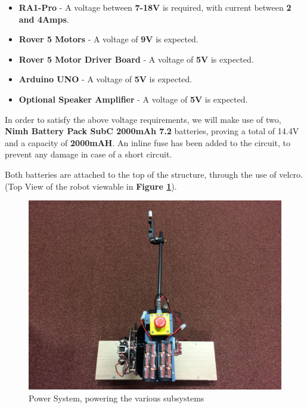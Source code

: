 \documentclass[12p,a4paper]{report}
\begin{document}
\begin{itemize}
\item \textbf{RA1-Pro} - A voltage between \textbf{7-18V} is required, with current between \textbf{2 and 4Amps}.

\item \textbf{Rover 5 Motors} - A voltage of \textbf{9V} is expected.

\item \textbf{Rover 5 Motor Driver Board} - A voltage of \textbf{5V} is expected.

\item \textbf{Arduino UNO} - A voltage of \textbf{5V} is expected.

\item \textbf{Optional Speaker Amplifier} - A voltage of \textbf{5V} is expected.

\end{itemize}

In order to satisfy the above voltage requirements, we will make use of two, \textbf{Nimh Battery Pack SubC 2000mAh 7.2} batteries, proving a total of 14.4V and a capacity of \textbf{2000mAH}. An inline fuse has been added to the circuit, to prevent any damage in case of a short circuit.

Both batteries are attached to the top of the structure, through the use of velcro. (Top View of the robot viewable in \textbf{Figure \ref{fig:rover5power}}).


\begin{figure}[H]
\begin{center}
\includegraphics[scale=0.35]{power_source_low}
\caption{Power System, powering the various subsystems}
\label{fig:rover5power}
\end{center}
\end{figure}
\end{document}
